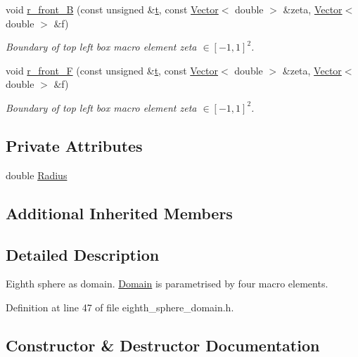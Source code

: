 \begin{DoxyCompactItemize}
void \hyperlink{classoomph_1_1EighthSphereDomain_aa62bb16a2963530246c8cc9ef905c944}{r\+\_\+front\+\_\+B} (const unsigned \&\hyperlink{cfortran_8h_af6f0bd3dc13317f895c91323c25c2b8f}{t}, const \hyperlink{classoomph_1_1Vector}{Vector}$<$ double $>$ \&zeta, \hyperlink{classoomph_1_1Vector}{Vector}$<$ double $>$ \&f)
\begin{DoxyCompactList}\small\item\em Boundary of top left box macro element zeta $ \in [-1,1]^2 $. \end{DoxyCompactList}\item 
void \hyperlink{classoomph_1_1EighthSphereDomain_a71d48567ee2661821f41dd50793a6eb1}{r\+\_\+front\+\_\+F} (const unsigned \&\hyperlink{cfortran_8h_af6f0bd3dc13317f895c91323c25c2b8f}{t}, const \hyperlink{classoomph_1_1Vector}{Vector}$<$ double $>$ \&zeta, \hyperlink{classoomph_1_1Vector}{Vector}$<$ double $>$ \&f)
\begin{DoxyCompactList}\small\item\em Boundary of top left box macro element zeta $ \in [-1,1]^2 $. \end{DoxyCompactList}\end{DoxyCompactItemize}
\subsection*{Private Attributes}
\begin{DoxyCompactItemize}
\item 
double \hyperlink{classoomph_1_1EighthSphereDomain_a9ef9d21c2c9ed0ea28652011b1756419}{Radius}
\end{DoxyCompactItemize}
\subsection*{Additional Inherited Members}


\subsection{Detailed Description}
Eighth sphere as domain. \hyperlink{classoomph_1_1Domain}{Domain} is parametrised by four macro elements. 

Definition at line 47 of file eighth\+\_\+sphere\+\_\+domain.\+h.



\subsection{Constructor \& Destructor Documentation}
\mbox{\label{classoomph_1_1EighthSphereDomain_a82c8a6b479e41bf07b9478e3d903b465}} 

